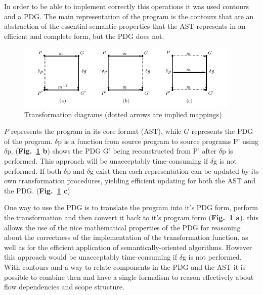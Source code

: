 In order to be able to implement correctly this operations it was used contours and a PDG. The main representation of the program is the contours that are an abstraction of the essential semantic properties that the AST represents in an efficient and complete form, but the PDG does not.
\begin{figure}[htbp]
  \centering
  \includegraphics[width=0.95\textwidth]{img/Griswold1.png}
  \caption{Transformation diagrams (dotted arrows are implied mappings)}
  \label{fig:Griswold}
\end{figure}

$P$ represents the program in its core format (AST), while $G$ represents the PDG of the program.
$\delta$p is a function from source program to source programs P' using $\delta$p. 
({\bf Fig.~\ref{fig:Griswold} b}) shows the PDG G' being reconstructed from P' after $\delta$p is performed. 
This approach will be unacceptably time-consuming if $\delta$g is not performed. 
If both $\delta$p and $\delta$g exist then each representation can be updated by its own transformation procedures, yielding efficient updating for both the AST and the PDG. ({\bf Fig.~\ref{fig:Griswold} c})

One way to use the PDG is to translate the program into it’s PDG form, perform the transformation and then convert it back to it’s program form ({\bf Fig.~\ref{fig:Griswold} a}). this allows the use of the nice mathematical properties of the PDG for reasoning about the correctness of the implementation of the transformation function, as well as for the efficient application of semantically-oriented algorithms. However this approach would be unacceptably time-consuming if $\delta$g is not performed. 
With contours and a way to relate components in the PDG and the AST it is possible to combine then and have a single formalism to reason effectively about flow dependencies and scope structure.








